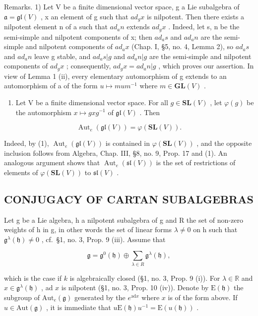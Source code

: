 Remarks. 1) Let V be a finite dimensional vector space, g a Lie subalgebra of \(\mathfrak{a} = \mathfrak{gl}(V)\) , x an element of g such that \(ad_{g}x\) is nilpotent. Then there exists a nilpotent element n of a such that \(ad_{a}n\) extends \(ad_{g}x\) . Indeed, let s, n be the semi-simple and nilpotent components of x; then \(ad_{a}s\) and \(ad_{a}n\) are the semi-simple and nilpotent components of \(ad_{a}x\) (Chap. I, §5, no. 4, Lemma 2), so \(ad_{a}s\) and \(ad_{a}n\) leave g stable, and \(ad_{a}s|g\) and \(ad_{a}n|g\) are the semi-simple and nilpotent components of \(ad_{g}x\) ; consequently, \(ad_{g}x = ad_{a}n|g\) , which proves our assertion. In view of Lemma 1 (ii), every elementary automorphism of g extends to an automorphism of a of the form \(u \mapsto mum^{-1}\) where \(m \in \mathbf{GL}(V)\) .

\begin{enumerate}
\def\labelenumi{\arabic{enumi})}
\setcounter{enumi}{1}
\tightlist
\item
  Let V be a finite dimensional vector space. For all \(g \in \mathbf{SL}(V)\) , let \(\varphi(g)\) be the automorphism \(x \mapsto gxg^{-1}\) of \(\mathfrak{gl}(V)\) . Then
\end{enumerate}

\[
\operatorname{Aut} _ {e} (\mathfrak {g l} (V)) = \varphi (\mathbf {S L} (V)).
\]

Indeed, by (1), \(\operatorname{Aut}_{e}(\mathfrak{gl}(V))\) is contained in \(\varphi(\mathbf{SL}(V))\) , and the opposite inclusion follows from Algebra, Chap. III, §8, no. 9, Prop. 17 and (1). An analogous argument shows that \(\operatorname{Aut}_{e}(\mathfrak{sl}(V))\) is the set of restrictions of elements of \(\varphi(\mathbf{SL}(V))\) to \(\mathfrak{sl}(V)\) .

\subsection{CONJUGACY OF CARTAN SUBALGEBRAS}

Let g be a Lie algebra, h a nilpotent subalgebra of g and R the set of non-zero weights of h in g, in other words the set of linear forms \(\lambda \neq 0\) on h such that \(\mathfrak{g}^{\lambda}(\mathfrak{h}) \neq 0\) , cf.~§1, no. 3, Prop. 9 (iii). Assume that

\[
\mathfrak {g} = \mathfrak {g} ^ {0} (\mathfrak {h}) \oplus \sum_ {\lambda \in R} \mathfrak {g} ^ {\lambda} (\mathfrak {h}),
\]

which is the case if \(k\) is algebraically closed (§1, no. 3, Prop. 9 (i)). For \(\lambda \in \mathbb{R}\) and \(x \in \mathfrak{g}^{\lambda}(\mathfrak{h})\) , ad \(x\) is nilpotent (§1, no. 3, Prop. 10 (iv)). Denote by \(\mathrm{E}(\mathfrak{h})\) the subgroup of \(\mathrm{Aut}_e(\mathfrak{g})\) generated by the \(e^{\mathrm{ad}x}\) where \(x\) is of the form above. If \(u \in \mathrm{Aut}(\mathfrak{g})\) , it is immediate that \(u\mathrm{E}(\mathfrak{h})u^{-1} = \mathrm{E}(u(\mathfrak{h}))\) .

